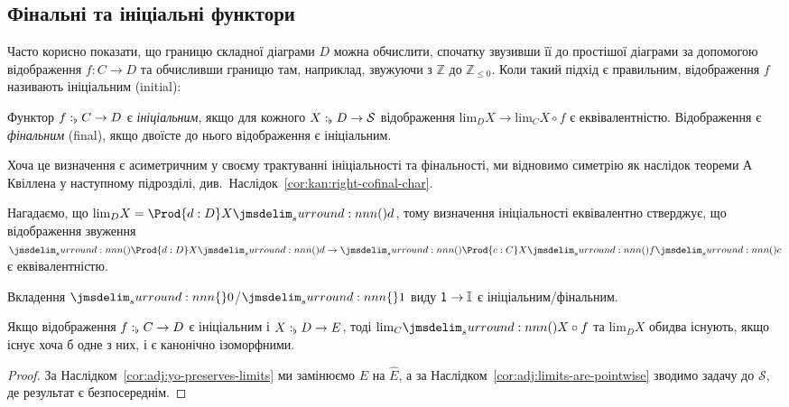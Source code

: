 \documentclass[12pt]{article}
\newcommand{\Space}{\mathcal{S}}
\newcommand{\PSH}[1]{\widehat{#1}}
\newcommand{\GM}{\flat}
\let\prn\DelimPrn
\let\brc\DelimBrc
\newcommand{\Lim}[1]{\mathrm{lim}_{#1}}
\begin{document}
\subsection{Фінальні та ініціальні функтори}
\label{sec:kan:cofinal}

Часто корисно показати, що границю складної діаграми $D$ можна обчислити, спочатку звузивши її до простішої діаграми за допомогою відображення $f : C \to D$ та обчисливши границю там, наприклад, звужуючи з $\mathbb{Z}$ до $\mathbb{Z}_{\le 0}$. Коли такий підхід є правильним, відображення $f$ називають ініціальним (initial):
\begin{defi}
  Функтор $\DeclVar{f}{\GM}{C \to D}$ є \emph{ініціальним}, якщо для кожного $\DeclVar{X}{\GM}{D \to \Space}$ відображення $\Lim{D} X \to \Lim{C} X \circ f$ є еквівалентністю. Відображення є \emph{фінальним} (final), якщо двоїсте до нього відображення є ініціальним.
\end{defi}
Хоча це визначення є асиметричним у своєму трактуванні ініціальності та фінальності, ми відновимо симетрію як наслідок теореми А Квіллена у наступному підрозділі, див.~Наслідок~\ref{cor:kan:right-cofinal-char}.

Нагадаємо, що $\Lim{D} X = \Prod{d : D} X\prn{d}$, тому визначення ініціальності еквівалентно стверджує, що відображення звуження $\prn{\Prod{d : D} X\prn{d}} \to \prn{\Prod{c : C} X\prn{f\prn{c}}}$ є еквівалентністю.

\begin{exa}
  Вкладення $\brc{0}$/$\brc{1}$ виду ${\Unit \to \Int}$ є ініціальним/фінальним.
\end{exa}

\begin{lem}
  \label{lem:kan:left-cofinal-preserves-limit}
  Якщо відображення $\DeclVar{f}{\GM}{C \to D}$ є ініціальним і $\DeclVar{X}{\GM}{D \to E}$, тоді $\Lim{C} \prn{X \circ f}$ та $\Lim{D} X$ обидва існують, якщо існує хоча б одне з них, і є канонічно ізоморфними.
\end{lem}
\begin{proof}
  За Наслідком~\ref{cor:adj:yo-preserves-limits} ми замінюємо $E$ на $\PSH{E}$, а за Наслідком~\ref{cor:adj:limits-are-pointwise} зводимо задачу до $\Space$, де результат є безпосереднім.
\end{proof}
\end{document}
